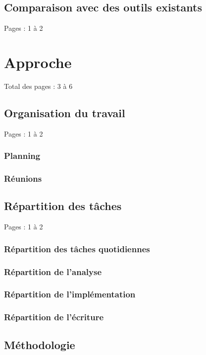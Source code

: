 \documentclass{eplmastersthesis_FR}
\begin{document}
		\section{Comparaison avec des outils existants}

			Pages : 1 à 2



	\chapter{Approche}

		Total des pages : 3 à 6

		\section{Organisation du travail}

			Pages : 1 à 2

			\subsection*{Planning}
			\subsection*{Réunions}

		\section{Répartition des tâches}

			Pages : 1 à 2

			\subsection*{Répartition des tâches quotidiennes}
			\subsection*{Répartition de l'analyse}
			\subsection*{Répartition de l'implémentation}
			\subsection*{Répartition de l'écriture}

		\section{Méthodologie}
\end{document}
